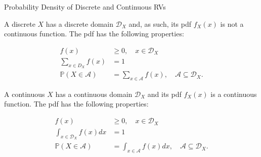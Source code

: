 \documentclass[handout,9pt]{beamer}
\begin{document}
%
\begin{frame}{Probability Density of Discrete and Continuous RVs}

A discrete $X$ has a discrete domain $\mathcal{D}_X$ and, as such, its pdf $f_X(x)$ is not a continuous function. The pdf has the following properties:
\begin{block}{}

\begin{align*}
f(x)&\geq 0,\quad x\in \mathcal{D}_X\\
\sum_{x\in D_X}f(x)&=1\\
\mathbb{P}(X\in \mathcal{A})&=\sum_{x\in \mathcal{A}}f(x),\quad  \mathcal{A}\subseteq \mathcal{D}_X.
\end{align*}
\end{block}

A continuous $X$ has a continuous domain $\mathcal{D}_X$ and its pdf $f_X(x)$ is a continuous function. The pdf has the following properties:
\begin{block}{}
\begin{align*}
f(x)&\geq 0,\quad x\in \mathcal{D}_X\\
\int_{x\in \mathcal{D}_X}f(x)dx&=1\\
\mathbb{P}(X\in \mathcal{A})&=\int_{x\in \mathcal{A}}f(x)dx,\quad  \mathcal{A}\subseteq \mathcal{D}_X.
\end{align*}
\end{block}



\end{frame}
\end{document}
